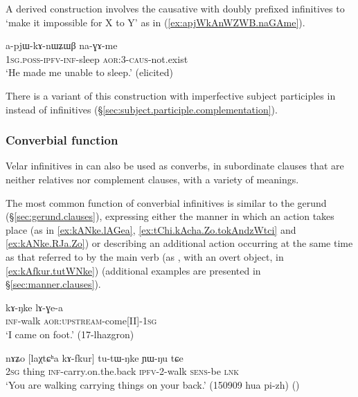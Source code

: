 A derived construction involves the causative  with doubly prefixed infinitives to `make it impossible for X to Y' as in (\ref{ex:apjWkAnWZWB.naGAme}).

\begin{exe}
\ex \label{ex:apjWkAnWZWB.naGAme}
\gll a-pjɯ-kɤ-nɯʑɯβ na-ɣɤ-me \\
\textsc{1sg}.\textsc{poss}-\textsc{ipfv}-\textsc{inf}-sleep \textsc{aor}:3\flobv{}-\textsc{caus}-not.exist \\
\glt `He made me unable to sleep.' (elicited)
\end{exe}

There is a variant of this construction with imperfective subject participles in  instead of infinitives (§\ref{sec:subject.participle.complementation}). 

\subsubsection{Converbial function}    \label{sec:inf.converb}
Velar infinitives in  can also be used as converbs, in subordinate clauses that are neither relatives nor complement clauses, with a variety of meanings.

The most common function of converbial infinitives is similar to the gerund (§\ref{sec:gerund.clauses}), expressing either the manner in which an action takes place (as in \ref{ex:kANke.lAGea}, \ref{ex:tChi.kAcha.Zo.tokAndzWtci} and \ref{ex:kANke.RJa.Zo}) or describing an additional action occurring at the same time as that referred to by the main verb (as , with an overt object, in \ref{ex:kAfkur.tutWNke}) (additional examples are presented in §\ref{sec:manner.clauses}).

\begin{exe}
\ex \label{ex:kANke.lAGea}
\gll  kɤ-ŋke lɤ-ɣe-a \\
\textsc{inf}-walk  \textsc{aor}:\textsc{upstream}-come[II]-\textsc{1sg} \\
\glt `I came on foot.' (17-lhazgron)
\end{exe}

\begin{exe}
\ex \label{ex:kAfkur.tutWNke}
\gll nɤʑo [laχtɕʰa kɤ-fkur] tu-tɯ-ŋke ɲɯ-ŋu tɕe \\
\textsc{2sg} thing \textsc{inf}-carry.on.the.back \textsc{ipfv}-2-walk \textsc{sens}-be \textsc{lnk} \\
\glt `You are walking carrying things on your back.' (150909 hua pi-zh)
()
\end{exe}

